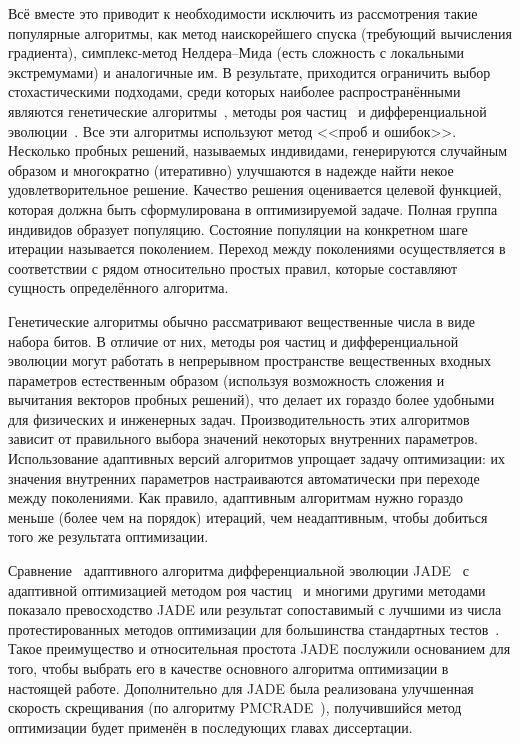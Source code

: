 Всё вместе это приводит к необходимости исключить из рассмотрения
такие популярные алгоритмы, как метод наискорейшего спуска (требующий
вычисления градиента), симплекс-метод Нелдера--Мида (есть сложность с
локальными экстремумами) и аналогичные им. В результате, приходится
ограничить выбор стохастическими подходами, среди которых наиболее
распространёнными являются генетические
алгоритмы~\cite{Goldberg-GA-1989}, методы  роя
частиц~\cite{Kennedy-PSO-1995} и дифференциальной
эволюции~\cite{Storn-DE-first-1997}.  Все эти алгоритмы используют
метод <<проб и ошибок>>.  Несколько пробных решений, называемых
индивидами, генерируются случайным образом и многократно (итеративно)
улучшаются в надежде найти некое удовлетворительное решение. Качество
решения оценивается целевой функцией, которая должна быть
сформулирована в оптимизируемой задаче.  Полная группа индивидов
образует популяцию.  Состояние популяции на конкретном шаге итерации
называется поколением.  Переход между поколениями осуществляется в
соответствии с рядом относительно простых правил, которые составляют
сущность определённого алгоритма.

Генетические алгоритмы обычно рассматривают вещественные числа в виде
набора битов.  В отличие от них, методы роя частиц и дифференциальной
эволюции могут работать в непрерывном пространстве вещественных
входных параметров естественным образом (используя возможность
сложения и вычитания векторов пробных решений), что делает их гораздо
более удобными для физических и инженерных задач.
Производительность этих алгоритмов зависит от правильного выбора
значений некоторых внутренних параметров.  Использование
адаптивных версий алгоритмов упрощает задачу оптимизации: их значения
внутренних параметров настраиваются автоматически при переходе между
поколениями. Как правило, адаптивным алгоритмам нужно гораздо меньше
(более чем на порядок) итераций, чем неадаптивным, чтобы добиться того
же результата оптимизации.

Сравнение~\cite{Gong-compare-EA-2014,Kang-compare-EA-RABC-2011}
адаптивного алгоритма дифференциальной эволюции
JADE~\cite{Jingqiao-JADE-2009} с адаптивной оптимизацией методом роя
частиц~\cite{Zhan-APSO-2008} и многими другими методами показало
превосходство JADE или результат сопоставимый с лучшими из числа
протестированных методов оптимизации для большинства стандартных
тестов~\cite{Schwefel-1981,Rosenbrock-1960,Muhlenbein-1991,back-1996,Griewank-1981}.
Такое преимущество и относительная простота JADE послужили
основанием для того, чтобы выбрать его в качестве основного алгоритма 
оптимизации в настоящей работе. Дополнительно для JADE была
реализована улучшенная скорость скрещивания (по алгоритму
PMCRADE~\cite{Li-PMCRADE-2011}), получившийся метод оптимизации будет
применён в последующих главах диссертации.

